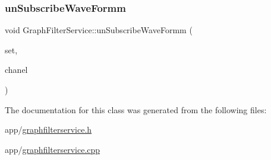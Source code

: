 \subsubsection{\texorpdfstring{un\+Subscribe\+Wave\+Formm}{unSubscribeWaveFormm}}
{\footnotesize\ttfamily void Graph\+Filter\+Service\+::un\+Subscribe\+Wave\+Formm (\begin{DoxyParamCaption}\item[{Q\+X\+Y\+Series $\ast$}]{set,  }\item[{int}]{chanel }\end{DoxyParamCaption})\hspace{0.3cm}{\ttfamily [slot]}}



The documentation for this class was generated from the following files\+:\begin{DoxyCompactItemize}
\item 
app/\hyperlink{graphfilterservice_8h}{graphfilterservice.\+h}\item 
app/\hyperlink{graphfilterservice_8cpp}{graphfilterservice.\+cpp}\end{DoxyCompactItemize}
